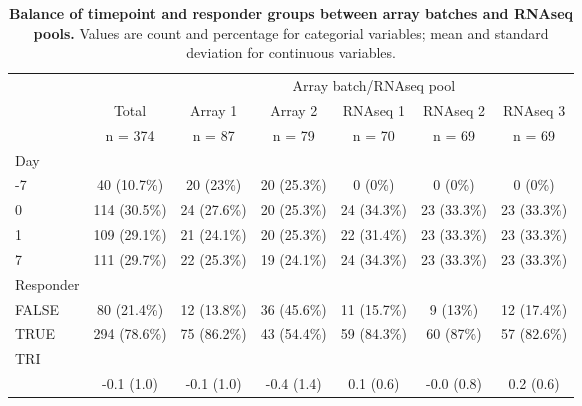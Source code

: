 \begin{table}[ ht ] 
 \centering 
 \caption{\textbf{Balance of timepoint and responder groups between array batches and \gls{RNAseq} pools.} Values are count and percentage for categorial variables; mean and standard deviation for continuous variables.}\label{tab:hird_batch_balance}
 \begin{tabular}{ l c c c c c c }
 \toprule
  &   &  \multicolumn{ 5 }{c}{ Array batch/\gls{RNAseq} pool }\\ 
  & Total & Array 1 & Array 2 & \gls{RNAseq} 1 & \gls{RNAseq} 2 & \gls{RNAseq} 3\\ 
  & n = 374 & n = 87 & n = 79 & n = 70 & n = 69 & n = 69 \\ 
  \midrule
 Day &   &   &   &   &   &  \\ 
 \hspace{6pt}    -7 & 40 (10.7\%) & 20 (23\%) & 20 (25.3\%) & 0 (0\%) & 0 (0\%) & 0 (0\%)\\ 
 \hspace{6pt}    0 & 114 (30.5\%) & 24 (27.6\%) & 20 (25.3\%) & 24 (34.3\%) & 23 (33.3\%) & 23 (33.3\%)\\ 
 \hspace{6pt}    1 & 109 (29.1\%) & 21 (24.1\%) & 20 (25.3\%) & 22 (31.4\%) & 23 (33.3\%) & 23 (33.3\%)\\ 
 \hspace{6pt}    7 & 111 (29.7\%) & 22 (25.3\%) & 19 (24.1\%) & 24 (34.3\%) & 23 (33.3\%) & 23 (33.3\%)\\ 
 Responder &   &   &   &   &   &  \\ 
 \hspace{6pt}    FALSE & 80 (21.4\%) & 12 (13.8\%) & 36 (45.6\%) & 11 (15.7\%) & 9 (13\%) & 12 (17.4\%)\\ 
 \hspace{6pt}    TRUE & 294 (78.6\%) & 75 (86.2\%) & 43 (54.4\%) & 59 (84.3\%) & 60 (87\%) & 57 (82.6\%)\\ 
 TRI &   &   &   &   &   &  \\ 
 \hspace{6pt}   & -0.1 (1.0) & -0.1 (1.0) & -0.4 (1.4) & 0.1 (0.6) & -0.0 (0.8) & 0.2 (0.6)\\ 
 \bottomrule
 
 \end{tabular}
 \end{table}
